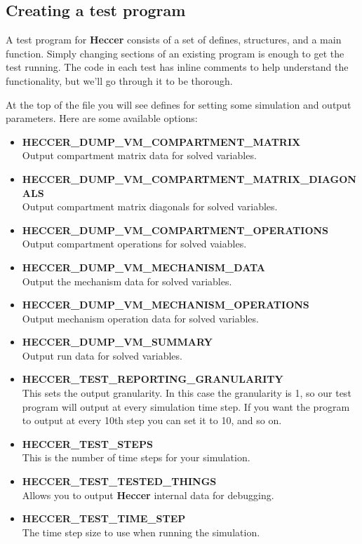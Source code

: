 \documentclass[12pt]{article}
\begin{document}
\subsection*{Creating a test program}

A test program for {\bf Heccer} consists of a set of defines, structures, and a main function. Simply changing sections of an existing program is enough to get the test running. The code in each test has inline comments to help understand the functionality, but we'll go through it to be thorough.

At the top of the file you will see defines for setting some simulation and output parameters. Here are some available options:

\begin{itemize}
   \item[]{\bf HECCER\_DUMP\_VM\_COMPARTMENT\_MATRIX} \\
      Output compartment matrix data for solved variables.

   \item[]{\bf HECCER\_DUMP\_VM\_COMPARTMENT\_MATRIX\_DIAGONALS} \\
      Output compartment matrix diagonals for solved variables.

   \item[]{\bf HECCER\_DUMP\_VM\_COMPARTMENT\_OPERATIONS} \\
      Output compartment operations for solved vaiables.

   \item[]{\bf HECCER\_DUMP\_VM\_MECHANISM\_DATA} \\
      Output the mechanism data for solved variables.

   \item[]{\bf HECCER\_DUMP\_VM\_MECHANISM\_OPERATIONS} \\
      Output mechanism operation data for solved variables.

   \item[]{\bf HECCER\_DUMP\_VM\_SUMMARY} \\
      Output run data for solved variables.

   \item[]{\bf HECCER\_TEST\_REPORTING\_GRANULARITY} \\
      This sets the output granularity. In this case the granularity is 1, so our test program will output at every simulation time step. If you want the program to output at every 10th step you can set it to 10, and so on.

   \item[]{\bf HECCER\_TEST\_STEPS} \\
      This is the number of time steps for your simulation.

   \item[]{\bf HECCER\_TEST\_TESTED\_THINGS} \\
      Allows you to output {\bf Heccer} internal data for debugging.

   \item[]{\bf HECCER\_TEST\_TIME\_STEP} \\
      The time step size to use when running the simulation.
\end{itemize}
\end{document}
